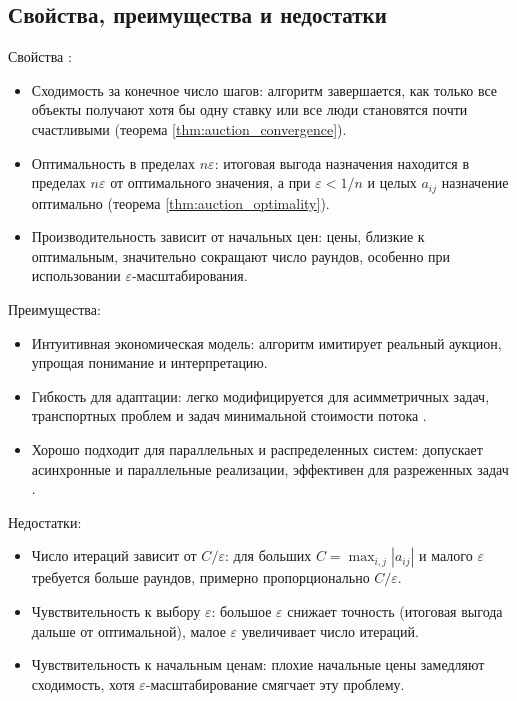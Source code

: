 \subsection{Свойства, преимущества и недостатки}
Свойства \cite{bertsekas1990}:
\begin{itemize}
    \item Сходимость за конечное число шагов: алгоритм завершается, как только все объекты получают хотя бы одну ставку или все люди становятся почти счастливыми (теорема \ref{thm:auction_convergence}).
    \item Оптимальность в пределах $n \varepsilon$: итоговая выгода назначения находится в пределах $n \varepsilon$ от оптимального значения, а при $\varepsilon < 1/n$ и целых $a_{ij}$ назначение оптимально (теорема \ref{thm:auction_optimality}).
    \item Производительность зависит от начальных цен: цены, близкие к оптимальным, значительно сокращают число раундов, особенно при использовании $\varepsilon$-масштабирования.
\end{itemize}

Преимущества:
\begin{itemize}
    \item Интуитивная экономическая модель: алгоритм имитирует реальный аукцион, упрощая понимание и интерпретацию.
    \item Гибкость для адаптации: легко модифицируется для асимметричных задач, транспортных проблем и задач минимальной стоимости потока \cite{bertsekas1990}.
    \item Хорошо подходит для параллельных и распределенных систем: допускает асинхронные и параллельные реализации, эффективен для разреженных задач \cite{gerkey2003}.
\end{itemize}

Недостатки:
\begin{itemize}
    \item Число итераций зависит от $C / \varepsilon$: для больших $C = \max_{i,j} |a_{ij}|$ и малого $\varepsilon$ требуется больше раундов, примерно пропорционально $C / \varepsilon$.
    \item Чувствительность к выбору $\varepsilon$: большое $\varepsilon$ снижает точность (итоговая выгода дальше от оптимальной), малое $\varepsilon$ увеличивает число итераций.
    \item Чувствительность к начальным ценам: плохие начальные цены замедляют сходимость, хотя $\varepsilon$-масштабирование смягчает эту проблему.
\end{itemize}


